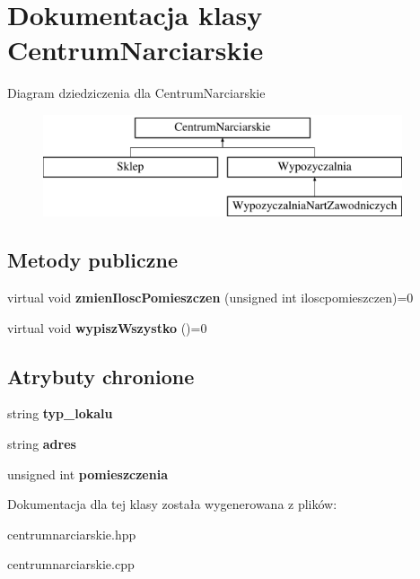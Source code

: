 \hypertarget{class_centrum_narciarskie}{}\section{Dokumentacja klasy Centrum\+Narciarskie}
\label{class_centrum_narciarskie}
Diagram dziedziczenia dla Centrum\+Narciarskie\begin{figure}[H]
\begin{center}
\leavevmode
\includegraphics[height=3.000000cm]{class_centrum_narciarskie}
\end{center}
\end{figure}
\subsection*{Metody publiczne}
\begin{DoxyCompactItemize}
\item 
\mbox{\label{class_centrum_narciarskie_aa355c508b58fddb6b3bcaed4c25b48ef}} 
virtual void {\bfseries zmien\+Ilosc\+Pomieszczen} (unsigned int iloscpomieszczen)=0
\item 
\mbox{\label{class_centrum_narciarskie_a15784c30d71940ca8175ec08017c5cef}} 
virtual void {\bfseries wypisz\+Wszystko} ()=0
\end{DoxyCompactItemize}
\subsection*{Atrybuty chronione}
\begin{DoxyCompactItemize}
\item 
\mbox{\label{class_centrum_narciarskie_a671a12e1f05ad515f1d34674d475089b}} 
string {\bfseries typ\+\_\+lokalu}
\item 
\mbox{\label{class_centrum_narciarskie_aeb2c143fb961e8a7a1ef5440bf47b22f}} 
string {\bfseries adres}
\item 
\mbox{\label{class_centrum_narciarskie_a8081f1fcecfec0e8052b8f600d5cdffd}} 
unsigned int {\bfseries pomieszczenia}
\end{DoxyCompactItemize}


Dokumentacja dla tej klasy została wygenerowana z plików\+:\begin{DoxyCompactItemize}
\item 
centrumnarciarskie.\+hpp\item 
centrumnarciarskie.\+cpp\end{DoxyCompactItemize}
